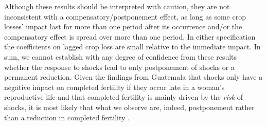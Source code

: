 \documentclass[letterpaper,12pt]{article}
\begin{document}
Although these results should be interpreted with caution, they
are not inconsistent with a compensatory/postponement effect, 
as long as some crop losses' impact last for more than one
period after its occurrence and/or the compensatory effect is
spread over more than one period.
In either specification the coefficients on lagged crop loss
are small relative to the immediate impact.
In sum, we cannot establish with any degree of confidence from
these results whether the response to shocks lead to only postponement 
of shocks or a permanent reduction.
Given the findings from Guatemala that shocks only 
have a negative impact on completed fertility if they occur
late in a woman's reproductive life and that completed 
fertility is mainly driven by the \emph{risk} of shocks,
it is most likely that what we observe are, indeed, postponement
rather than a reduction in completed fertility \citep{Portner2014}.

\end{document}
